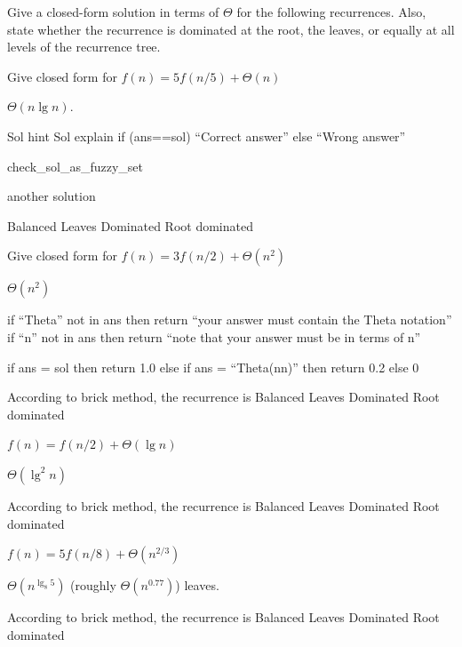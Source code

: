 \begin{problem}[40.]
Give a closed-form
solution in terms of $\Theta$ for the following recurrences.  Also, state
whether the recurrence is dominated at the root, the leaves, or
equally at all levels of the recurrence tree.


\ask[10.0]
Give closed form for  
$f(n) = 5f(n/5) + \Theta(n)$


\sol[0.5] 
$\Theta (n \lg n)$.

\hint Sol hint
\explain Sol explain
\algoc
if (ans==sol) {
  ``Correct answer''
}
else {
  ``Wrong answer''
}

\algog
  check_sol_as_fuzzy_set

\sol[1.5]
another solution

\onechoice[8.] 

\choice[1.0] Balanced
\choice[0.4] Leaves Dominated
\choice[0.6] Root dominated 



\ask[2.]
Give closed form for  
$f(n) = 3f(n/2) + \Theta(n^2)$

\sol
$\Theta(n^2)$

\algoc
if ``Theta'' not in ans then
  return ``your answer must contain the Theta notation''
if ``n'' not in ans then
  return ``note that your answer must be in terms of n''

\algog
  if ans = sol then
    return 1.0
  else if ans = ``Theta(n\lg n)'' then
    return 0.2
  else 0




\onechoice  According to brick method, the recurrence is
\choice Balanced
\choice Leaves Dominated
\choice* Root dominated

\ask[2.]
$f(n) = f(n/2) + \Theta(\lg n)$

\sol
$\Theta (\lg^2 n)$

\onechoice[10]  According to brick method, the recurrence is
\choice*[1.0] Balanced
\choice[0.2] Leaves Dominated
\choice Root dominated

\ask[2]
$f(n) = 5f(n/8) +\Theta(n^{2/3})$

\sol
$\Theta(n^{\lg_8 5})$ (roughly $\Theta(n^{0.77})$) leaves.





\onechoice  According to brick method, the recurrence is
\choice Balanced
\choice* Leaves Dominated
\choice Root dominated

\end{problem}



